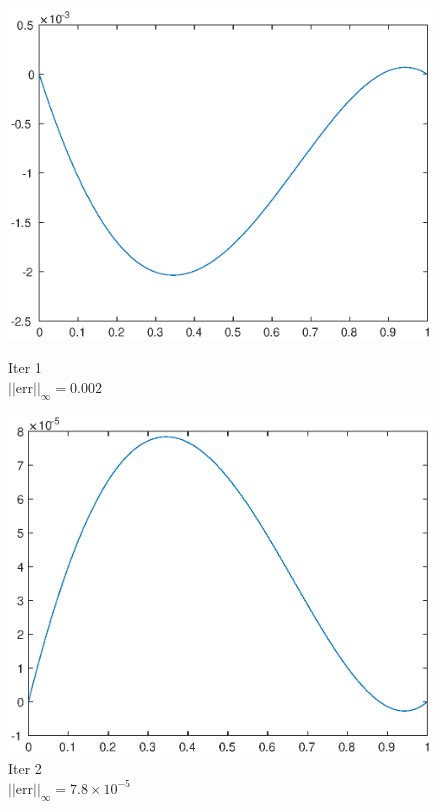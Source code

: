 \documentclass[lang=cn,10pt]{elegantbook}
\begin{document}
\begin{figure}[H]
  \centering
  \begin{minipage}[t]{0.24\linewidth}
      \centering
      \includegraphics[width=0.9\linewidth]{figure/1-5-1.eps}
      \caption*{\small Iter 1 \\ $||\text{err}||_\infty=0.002$}
  \end{minipage}
  \begin{minipage}[t]{0.24\linewidth}
    \centering
    \includegraphics[width=0.9\linewidth]{figure/1-5-2.eps}
    \caption*{\small Iter 2 \\ $||\text{err}||_\infty=7.8\times 10^{-5}$}
  \end{minipage}
  \begin{minipage}[t]{0.24\linewidth}
    \centering

\end{minipage}
\end{figure}
\end{document}
